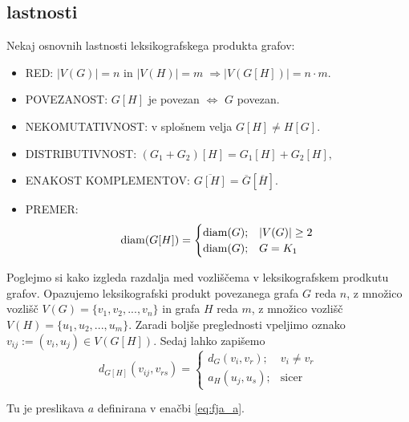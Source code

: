 \documentclass[mat1, tisk]{fmfdelo}
\newcommand{\1}{(1, 1, ..., 1)}
\newcommand{\2}{(2, 2, ..., 2)}
\begin{document}


\subsection{lastnosti} \label{ss:lastnosti_leks_prod}
Nekaj osnovnih lastnosti leksikografskega produkta grafov:
\begin{itemize}
    \item RED: $|V(G)| = n$ in $|V(H)| = m \; \Rightarrow |V(G[H])| = n \cdot m.$
    \item POVEZANOST: $G[H]$ je povezan $\Leftrightarrow$ $G$ povezan. 
    \item NEKOMUTATIVNOST: v splošnem velja $G[H] \neq H[G].$
    \item DISTRIBUTIVNOST: $(G_1 + G_2)[H] = G_1[H] + G_2[H],$ 
    \item ENAKOST KOMPLEMENTOV: $\overline{G[H]} = \overline{G} [\overline{H}].$
    \item PREMER: $$ {\rm diam}(G[H]) =  \begin{cases} 
        {\rm diam}(G); & |V(G)| \geq 2 \\
        {\rm diam}(G); & G = K_1
        \end{cases}$$

\end{itemize}

Poglejmo si kako izgleda razdalja med vozliščema v leksikografskem prodkutu grafov. 
Opazujemo leksikografski produkt povezanega grafa $G$ reda $n$, z množico vozlišč
$V(G) = \{v_1, v_2, ... , v_n \}$ in grafa $H$ reda $m$, z množico vozlišč 
$V(H) = \{u_1, u_2, ... , u_m \}$. Zaradi boljše preglednosti vpeljimo oznako 
$v_{ij} := (v_i, u_j) \in V(G[H]).$
Sedaj lahko zapišemo
\begin{equation} \label{eq:razdalja_produkta}
    d_{G[H]}(v_{ij}, v_{rs}) = 
    \begin{cases}
        d_G(v_i, v_r); & v_i \neq v_r \\
        a_H(u_j, u_s); & \text{sicer}
    \end{cases}
\end{equation} 

Tu je preslikava $a$ definirana v enačbi \ref{eq:fja_a}.


\end{document}
